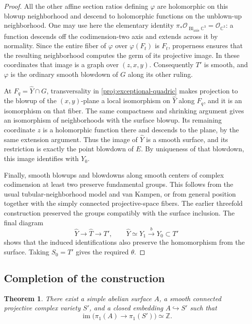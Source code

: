 \documentclass[11pt,reqno]{amsart}
\numberwithin{equation}{section}
\newtheorem{theorem}{Theorem}[section]
\theoremstyle{definition}
\theoremstyle{remark}
\newcommand{\C}{\mathbb C}
\newcommand{\Z}{\mathbb Z}
\DeclareMathOperator{\im}{im}
\begin{document}
\begin{proof}
All the other affine section ratios defining $\varphi$ are holomorphic
on this blowup neighborhood and descend to holomorphic functions on
the unblown-up neighborhood.  One may use here the elementary identity
$\pi_*\mathcal O_{\operatorname{Bl}_{\mathrm{axis}}\C^3}
=\mathcal O_{\C^3}$: a function descends off the codimension-two axis
and extends across it by normality.  Since the entire fiber of
$\varphi$ over $\varphi(F_t)$ is $F_t$, properness ensures that the
resulting neighborhood computes the germ of its projective image.
In these coordinates that image is a graph over $(z,x,y)$.
Consequently $T'$ is smooth, and $\varphi$ is the ordinary smooth
blowdown of $G$ along its other ruling.

At $F_q=\widehat Y\cap G$, transversality in
\eqref{proj:exceptional-quadric} makes projection to the blowup of the
$(x,y)$-plane a local isomorphism on $\widehat Y$ along $F_q$, and it
is an isomorphism on that fiber.  The same compactness and shrinking
argument gives an isomorphism of neighborhoods with the surface
blowup.  Its remaining coordinate $z$ is a holomorphic function there and
descends to the plane, by the same extension argument.  Thus the
image of $\widehat Y$ is a smooth surface, and its restriction is
exactly the point blowdown of $E$.  By uniqueness of that blowdown,
this image identifies with $Y_0$.

Finally, smooth blowups and blowdowns along smooth centers of complex
codimension at least two preserve fundamental groups.  This follows
from the usual tubular-neighborhood model and van Kampen, or from
general position together with the simply connected projective-space
fibers.  The earlier threefold construction preserved the groups
compatibly with the surface inclusion.  The final diagram
\[
 \widehat Y\longrightarrow\widehat T\longrightarrow T',
 \qquad \widehat Y\simeq Y_1\xrightarrow{b}Y_0\subset T'
\]
shows that the induced identifications also preserve the homomorphism
from the surface.  Taking $S_0=T'$ gives the required $\theta$.
\end{proof}

\subsection{Completion of the construction}

\begin{theorem}\label{thm:cyclic-embedding}
There exist a simple abelian surface $A$, a smooth connected projective
complex variety $S'$, and a closed embedding $A\hookrightarrow S'$
such that
\[
 \im\bigl(\pi_1(A)\longrightarrow\pi_1(S')\bigr)\simeq\Z.
\]
\end{theorem}
\end{document}
